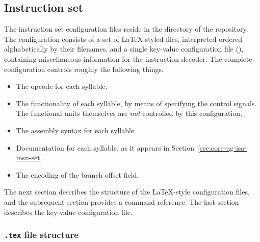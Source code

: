 
\subsection{Instruction set}
\label{sec:core-ug-cfg-opc}

The instruction set configuration files reside in the 
directory of the \rvex{} repository. The configuration consists of a set of
LaTeX-styled files, interpreted ordered alphabetically by their filenames,
and a single key-value configuration file (), containing
miscellaneous information for the instruction decoder. The complete
configuration controls roughly the following things.

\begin{itemize}

\item The opcode for each syllable.

\item The functionality of each syllable, by means of specifying the control
      signals. The functional units themselves are \emph{not} controlled by this
      configuration.
      
\item The assembly syntax for each syllable. 
      
\item Documentation for each syllable, as it appears in
      Section~\ref{sec:core-ug-isa-insn-set}.

\item The encoding of the branch offset field.

\end{itemize}

\noindent The next section describes the structure of the LaTeX-style
configuration files, and the subsequent section provides a command reference.
The last section describes the key-value configuration file.


\subsubsection[.tex file structure]{\texttt{.tex} file structure}
\label{sec:core-ug-cfg-opc-struct}

